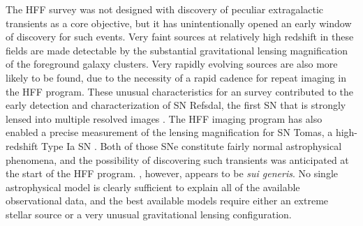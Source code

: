 The HFF survey was not designed with discovery of peculiar
extragalactic transients as a core objective, but it has
unintentionally opened an early window of discovery for such events.
Very faint sources at relatively high redshift in these fields are
made detectable by the substantial gravitational lensing magnification
of the foreground galaxy clusters.  Very rapidly evolving sources are
also more likely to be found, due to the necessity of a rapid cadence
for repeat imaging in the HFF program.  These unusual characteristics
for an \HST survey contributed to the early detection and
characterization of SN Refsdal, the first SN that is strongly lensed
into multiple resolved images \citep{Kelly:2015a}.  The HFF imaging
program has also enabled a precise measurement of the lensing
magnification for SN Tomas, a high-redshift Type Ia SN
\citep{Rodney:2015a}.  Both of those SNe constitute fairly normal
astrophysical phenomena, and the possibility of discovering such
transients was anticipated at the start of the HFF program.  \spock,
however, appears to be {\it sui generis}.  No single astrophysical
model is clearly sufficient to explain all of the available
observational data, and the best available models require either an
extreme stellar source or a very unusual gravitational lensing
configuration.
